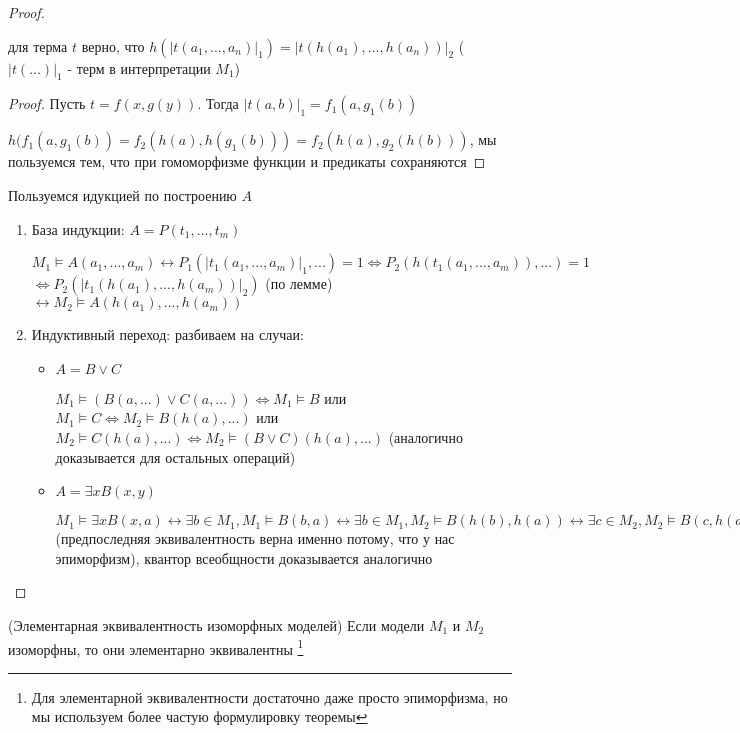 \documentclass{article}
\begin{document}
\begin{proof}
    \begin{lemma}
        для терма $t$ верно, что $h(|t(a_1,..., a_n)|_1) = |t(h(a_1),..., h(a_n))|_2$ ($|t(...)|_1$ - терм в интерпретации $M_1$)
    \end{lemma}

    \begin{proof}
        Пусть $t = f(x, g(y))$. Тогда $|t(a,b)|_1 = f_1(a, g_1(b))$

        $h(f_1(a, g_1(b)) = f_2(h(a), h(g_1(b))) = f_2(h(a), g_2(h(b)))$, мы пользуемся тем, что при гомоморфизме функции и предикаты сохраняются
    \end{proof}

    Пользуемся идукцией по построению $A$
    \begin{enumerate}
        \item База индукции: $A = P(t_1,..., t_m)$

        $M_1 \vDash A(a_1,...,a_m) \leftrightarrow P_1(|t_1(a_1,..., a_m)|_1,...) = 1 \Leftrightarrow P_2(h(t_1(a_1,..., a_m)),...) = 1$\\
        $\Leftrightarrow P_2(|t_1(h(a_1),..., h(a_m))|_2)$ (по лемме) $\leftrightarrow M_2 \vDash A(h(a_1),..., h(a_m))$

        \item Индуктивный переход: разбиваем на случаи:
        \begin{itemize}
            \item $A = B \vee C$

            $M_1 \vDash (B(a,...) \vee C(a,...)) \Leftrightarrow M_1 \vDash B$ или $M_1 \vDash C \Leftrightarrow M_2 \vDash B(h(a),...)$ или $M_2 \vDash C(h(a),...) \Leftrightarrow M_2 \vDash (B \vee C)(h(a),...)$ (аналогично доказывается для остальных операций)
            \item $A = \exists x B(x, y)$

            $M_1 \vDash \exists x B(x, a) \leftrightarrow \exists b \in M_1, M_1 \vDash B(b, a) \leftrightarrow \exists b \in M_1, M_2 \vDash B(h(b), h(a)) \leftrightarrow \exists c \in M_2, M_2 \vDash B(c, h(a)) \leftrightarrow M_2 \vDash \exists x B(x, h(a))$ (предпоследняя эквивалентность верна именно потому, что у нас эпиморфизм), квантор всеобщности доказывается аналогично
        \end{itemize}
    \end{enumerate}
\end{proof}

\begin{theorem}{(Элементарная эквивалентность изоморфных моделей)}
	Если модели $M_1$ и $M_2$ изоморфны, то они элементарно эквивалентны \footnote{Для элементарной эквивалентности достаточно даже просто эпиморфизма, но мы используем более частую формулировку теоремы}
\end{theorem}
\end{document}
